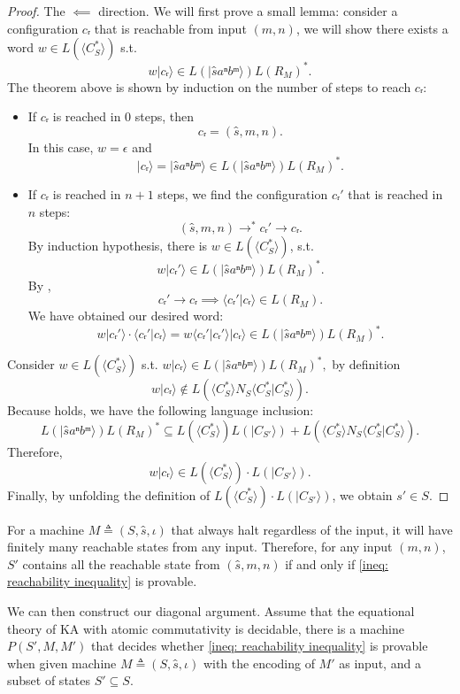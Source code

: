 \begin{proof}
  The \(⟸\) direction.
  We will first prove a small lemma: 
  consider a configuration \(cᵣ\) that is reachable from input \((m, n)\),
  we will show there exists a word \(w ∈ L(⟨C_S^*⟩)\) s.t.
  \[w |cᵣ⟩ ∈ L(|ŝ aⁿ bᵐ⟩) L(R_M)^*.\]
  The theorem above is shown by induction on the number of steps to reach \(cᵣ\):
  \begin{itemize}
    \item If \(cᵣ\) is reached in 0 steps, 
      then \[cᵣ = (ŝ, m, n).\]
      In this case, \(w = ϵ\) and 
      \[|cᵣ⟩ = |ŝ aⁿ bᵐ⟩ ∈ L(|ŝ aⁿ bᵐ⟩) L(R_M)^*.\]
    \item If \(cᵣ\) is reached in \(n+1\) steps,
      we find the configuration \(cᵣ'\) that is reached in \(n\) steps: 
      \[(ŝ, m, n) →^* cᵣ' → cᵣ.\]
      By induction hypothesis, there is \(w ∈ L(⟨C_S^*⟩)\), s.t.
      \[w |cᵣ'⟩ ∈ L(|ŝ aⁿ bᵐ⟩) L(R_M)^*.\]
      By ,
      \[cᵣ' → cᵣ ⟹ ⟨cᵣ' | cᵣ⟩ ∈ L(R_M).\]
      We have obtained our desired word:
      \[w |cᵣ'⟩ ⋅ ⟨cᵣ' | cᵣ⟩ = w ⟨cᵣ'|cᵣ'⟩ | cᵣ⟩ ∈ L(|ŝ aⁿ bᵐ⟩) L(R_M)^*.\]
  \end{itemize}

  Consider \(w ∈ L(⟨C_S^*⟩)\) s.t.
  \(w |cᵣ⟩ ∈ L(|ŝ aⁿ bᵐ⟩) L(R_M)^*,\) by definition
  \[w |cᵣ⟩ ∉ L(⟨C_S^*⟩ N_S ⟨C_S^* | C_S^*⟩).\]
  Because  holds, 
  we have the following language inclusion:
  \[L(|ŝ aⁿ bᵐ⟩) L(R_M)^* ⊆ L(⟨C_S^*⟩) L(|C_{S'}⟩) + L(⟨C_S^*⟩ N_S ⟨C_S^* | C_S^*⟩).\]
  Therefore,
  \[w |cᵣ⟩ ∈ L(⟨C_S^*⟩) ⋅ L(|C_{S'}⟩).\]
  Finally, by unfolding the definition of \(L(⟨C_S^*⟩) ⋅ L(|C_{S'}⟩)\),
  we obtain \(s' ∈ S\).
\end{proof}

\begin{corollary}\label{the: reachability provability equivalence for terminating machine}
  For a machine \(M ≜ (S, ŝ, ι)\) that always halt regardless of the input,
  it will have finitely many reachable states from any input.
  Therefore, for any input \((m, n)\), 
  \(S'\) contains all the reachable state from \((ŝ, m, n)\) if and only if
  \cref{ineq: reachability inequality} is provable.
\end{corollary}

We can then construct our diagonal argument.
Assume that the equational theory of KA with atomic commutativity is decidable,
there is a machine \(P(S', M, M')\) that decides whether 
\cref{ineq: reachability inequality} is provable when given machine \(M ≜ (S, ŝ, ι)\) 
with the encoding of \(M'\) as input, and a subset of states \(S' ⊆ S\).


